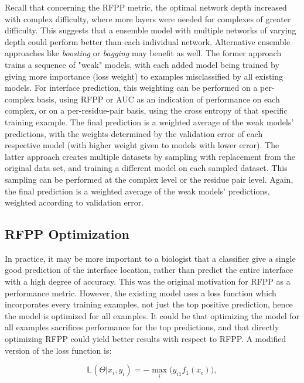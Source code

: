 Recall that concerning the RFPP metric, the optimal network depth increased with complex difficulty, where more layers were needed for complexes of greater difficulty. 
This suggests that a ensemble model with multiple networks of varying depth could perform  better than each individual network.
Alternative ensemble approaches like \emph{boosting} or \emph{bagging} may benefit as well.
The former approach trains a sequence of "weak" models, with each added model being trained by giving more importance (loss weight) to examples misclassified by all existing models.
For interface prediction, this weighting can be performed on a per-complex basis, using RFPP or AUC as an indication of performance on each complex, or on a per-residue-pair basis, using the cross entropy of that specific training example.
The final prediction is a weighted average of the weak models' predictions, with the weights determined by the validation error of each respective model (with higher weight given to models with lower error).
The latter approach creates multiple datasets by sampling with replacement from the original data set, and training a different model on each sampled dataset.
This sampling can be performed at the complex level or the residue pair level.
Again, the final prediction is a weighted average of the weak models' predictions, weighted according to validation error.



\subsection{RFPP Optimization}

In practice, it may be more important to a biologist that a classifier give a single good prediction of the interface location, rather than predict the entire interface with a high degree of accuracy.
This was the original motivation for RFPP as a performance metric.
However, the existing model uses a loss function which incorporates every training examples, not just the top positive prediction, hence the model is optimized for all examples.
It could be that optimizing the model for all examples sacrifices performance for the top predictions, and that directly optimizing RFPP could yield better results with respect to RFPP.
A modified version of the loss function is:

\begin{equation}
\mathbb{L}(\Theta | {x_i}, {y_i}) = - \max_{i} \big(y_{i1} f_1(x_i)\big),
\label{eq:rfpp_optimize}
\end{equation}

